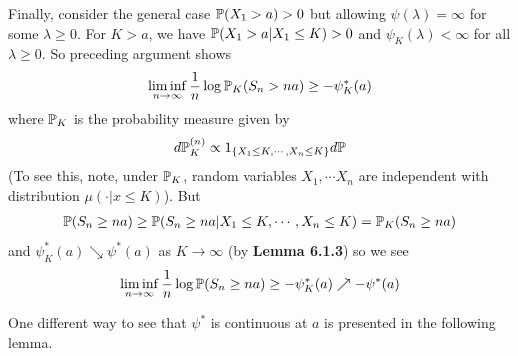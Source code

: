 \documentclass[12pt,a4paper]{report}
\newenvironment{proof}
{\begin{changemargin}{1cm}{0.5cm} 
	}%
	{\end{changemargin}
}
\begin{document}
\begin{proof}
\quad Finally, consider the general case $\mathbb{P}(X_1 >a) >0$ but allowing $\psi(\lambda) = \infty$ for some $\lambda \geq 0$. For $K>a$, we have $\mathbb{P}(X_1 >a | X_1 \leq K) >0$ and $\psi_K(\lambda) < \infty$ for all $\lambda \geq 0$. So preceding argument shows
\begin{align*}
\liminf_{n\rightarrow \infty} \frac{1}{n} \log \mathbb{P}_K (S_n > na) \geq -\psi_K^* (a)
\end{align*}
where $\mathbb{P}_K$ is the probability measure given by
\begin{align*}
d\mathbb{P}^{(n)}_K \propto 1_{ \{ X_1 \leq K, \cdots, X_n \leq K \}} d\mathbb{P}
\end{align*}
(To see this, note, under $\mathbb{P}_K$, random variables $X_1, \cdots X_n$ are independent with distribution $\mu(\cdot | x\leq K)$). But
\begin{align*}
\mathbb{P}(S_n \geq na) \geq \mathbb{P}(S_n \geq na | X_1\leq K, \cdots, X_n \leq K)  = \mathbb{P}_K(S_n \geq na)
\end{align*}
and $\psi^*_K(a) \searrow \psi^*(a)$ as $K\rightarrow \infty$ (by \textbf{Lemma 6.1.3}) so we see
\begin{align*}
\liminf_{n\rightarrow \infty} \frac{1}{n} \log \mathbb{P}(S_n \geq na) \geq -\psi^*_K(a) \nearrow -\psi^*(a)
\end{align*}

\eop
\end{proof}
\s

One different way to see that $\psi^*$ is continuous at $a$ is presented in the following lemma.
\s
\end{document}
